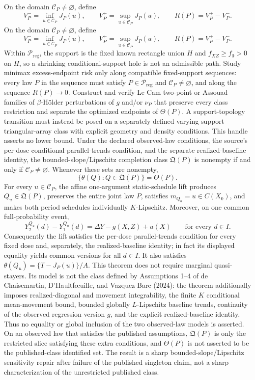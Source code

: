 On the domain \(\mathcal C_P\neq\varnothing\), define
\[
V_P^-=\inf_{u\in\mathcal C_P}J_P(u),\qquad
V_P^+=\sup_{u\in\mathcal C_P}J_P(u),\qquad
R(P)=V_P^+-V_P^-.
\]
On the domain \(\mathcal C_P\neq\varnothing\), define
\[
V_P^-=\inf_{u\in\mathcal C_P}J_P(u),\qquad
V_P^+=\sup_{u\in\mathcal C_P}J_P(u),\qquad
R(P)=V_P^+-V_P^-.
\]
Within \(\mathcal P_{\mathrm{reg}}\), the support is the fixed known rectangle union \(H\) and \(f_{XZ}\geq f_0>0\) on \(H\), so a shrinking conditional-support hole is not an admissible path. Study minimax excess-endpoint risk only along compatible fixed-support sequences: every law \(P\) in the sequence must satisfy \(P\in\mathcal P_{\mathrm{reg}}\) and \(\mathcal C_P\neq\varnothing\), and along the sequence \(R(P)\to0\). Construct and verify Le Cam two-point or Assouad families of \(\beta\)-H\"older perturbations of \(g\) and/or \(\nu_P\) that preserve every class restriction and separate the optimized endpoints of \(\Theta(P)\). A support-topology transition must instead be posed on a separately defined varying-support triangular-array class with explicit geometry and density conditions. This handle asserts no lower bound.
Under the declared observed-law conditions, the source's per-dose conditional-parallel-trends condition, and the separate realized-baseline identity, the bounded-slope/Lipschitz completion class \(\mathfrak Q(P)\) is nonempty if and only if \(\mathcal C_P\neq\varnothing\). Whenever these sets are nonempty,
\[
\{\theta(Q):Q\in\mathfrak Q(P)\}=\Theta(P).
\]
For every \(u\in\mathcal C_P\), the affine one-argument static-schedule lift produces \(Q_u\in\mathfrak Q(P)\), preserves the entire joint law \(P\), satisfies \(m_{Q_u}=u\in C(X_0)\), and makes both period schedules individually \(K\)-Lipschitz. Moreover, on one common full-probability event,
\[
Y_2^{Q_u}(d)-Y_1^{Q_u}(d)=\Delta Y-g(X,Z)+u(X)
\qquad\text{for every }d\in I.
\]
Consequently the lift satisfies the per-dose parallel-trends condition for every fixed dose and, separately, the realized-baseline identity; in fact its displayed equality yields common versions for all \(d\in I\). It also satisfies \(\theta(Q_u)=\{T-J_P(u)\}/A\). This theorem does not require marginal quasi-stayers. Its model is not the class defined by Assumptions 1--4 of de Chaisemartin, D'Haultf\oe{}uille, and Vazquez-Bare (2024): the theorem additionally imposes realized-diagonal and movement integrability, the finite \(K\) conditional mean-movement bound, bounded globally \(L\)-Lipschitz baseline trends, continuity of the observed regression version \(g\), and the explicit realized-baseline identity. Thus no equality or global inclusion of the two observed-law models is asserted. On an observed law that satisfies the published assumptions, \(\mathfrak Q(P)\) is only the restricted slice satisfying these extra conditions, and \(\Theta(P)\) is not asserted to be the published-class identified set. The result is a sharp bounded-slope/Lipschitz sensitivity repair after failure of the published singleton claim, not a sharp characterization of the unrestricted published class.
